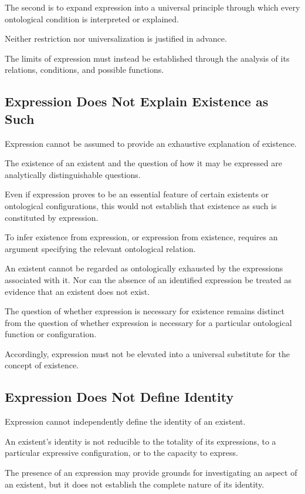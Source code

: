 The second is to expand expression into a universal
principle through which every ontological condition
is interpreted or explained.

Neither restriction nor universalization is justified
in advance.

The limits of expression must instead be established
through the analysis of its relations, conditions,
and possible functions.

\subsection{Expression Does Not Explain Existence as Such}

Expression cannot be assumed to provide an exhaustive
explanation of existence.

The existence of an existent and the question of how
it may be expressed are analytically distinguishable
questions.

Even if expression proves to be an essential feature
of certain existents or ontological configurations,
this would not establish that existence as such is
constituted by expression.

To infer existence from expression, or expression
from existence, requires an argument specifying
the relevant ontological relation.

An existent cannot be regarded as ontologically
exhausted by the expressions associated with it.
Nor can the absence of an identified expression
be treated as evidence that an existent does not exist.

The question of whether expression is necessary for
existence remains distinct from the question of
whether expression is necessary for a particular
ontological function or configuration.

Accordingly, expression must not be elevated into
a universal substitute for the concept of existence.

\subsection{Expression Does Not Define Identity}

Expression cannot independently define the identity
of an existent.

An existent's identity is not reducible to the totality
of its expressions, to a particular expressive configuration,
or to the capacity to express.

The presence of an expression may provide grounds
for investigating an aspect of an existent, but it
does not establish the complete nature of its identity.


